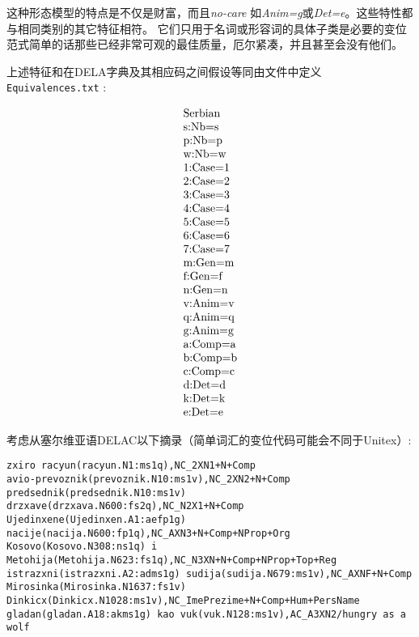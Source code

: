 \bigskip
\noindent 这种形态模型的特点是不仅是财富，而且\emph{no-care} 如\emph{Anim=g}或\emph{Det=e}。这些特性都与相同类别的其它特征相符。
它们只用于名词或形容词的具体子类是必要的变位范式简单的话那些已经非常可观的最佳质量，厄尔紧凑，并且甚至会没有他们。

\bigskip
\noindent 上述特征和在DELA字典及其相应码之间假设等同由文件中定义 \verb+Equivalences.txt+ :

\[
\begin{array}[l]{l}
$Serbian$ \\
$s:Nb=s$ \\
$p:Nb=p$ \\
$w:Nb=w$ \\
$1:Case=1$ \\
$2:Case=2$ \\
$3:Case=3$ \\
$4:Case=4$ \\
$5:Case=5$ \\
$6:Case=6$ \\
$7:Case=7$ \\
$m:Gen=m$ \\
$f:Gen=f$ \\
$n:Gen=n$ \\
$v:Anim=v$ \\
$q:Anim=q$ \\
$g:Anim=g$ \\
$a:Comp=a$ \\
$b:Comp=b$ \\
$c:Comp=c$ \\
$d:Det=d$ \\
$k:Det=k$ \\
$e:Det=e$
\end{array}
\]

\bigskip
\noindent 考虑从塞尔维亚语DELAC以下摘录（简单词汇的变位代码可能会不同于Unitex）:
\scriptsize
\begin{verbatim}
zxiro racyun(racyun.N1:ms1q),NC_2XN1+N+Comp
avio-prevoznik(prevoznik.N10:ms1v),NC_2XN2+N+Comp
predsednik(predsednik.N10:ms1v) drzxave(drzxava.N600:fs2q),NC_N2X1+N+Comp
Ujedinxene(Ujedinxen.A1:aefp1g) nacije(nacija.N600:fp1q),NC_AXN3+N+Comp+NProp+Org
Kosovo(Kosovo.N308:ns1q) i Metohija(Metohija.N623:fs1q),NC_N3XN+N+Comp+NProp+Top+Reg 
istrazxni(istrazxni.A2:adms1g) sudija(sudija.N679:ms1v),NC_AXNF+N+Comp
Mirosinka(Mirosinka.N1637:fs1v) Dinkicx(Dinkicx.N1028:ms1v),NC_ImePrezime+N+Comp+Hum+PersName
gladan(gladan.A18:akms1g) kao vuk(vuk.N128:ms1v),AC_A3XN2/hungry as a wolf
\end{verbatim}
\normalsize

